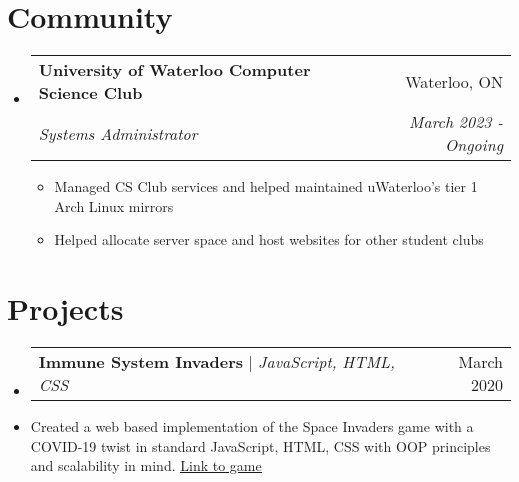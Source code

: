 \documentclass[letterpaper,11pt]{article}
\makeatletter
\newcommand{\resumeItem}[1]{
  \item\small{
    {#1 \vspace{-2pt}}
  }
}
\newcommand{\resumeSubheading}[4]{
  \vspace{-2pt}\item
    \begin{tabular*}{0.97\textwidth}[t]{l@{\extracolsep{\fill}}r}
      \textbf{#1} & #2 \\
      \textit{\small#3} & \textit{\small #4} \\
    \end{tabular*}\vspace{-7pt}
}
\newcommand{\resumeProjectHeading}[2]{
    \item
    \begin{tabular*}{0.97\textwidth}{l@{\extracolsep{\fill}}r}
      \small#1 & #2 \\
    \end{tabular*}\vspace{-7pt}
}
\newcommand{\resumeSubHeadingListStart}{\begin{itemize}[leftmargin=0.15in, label={}]}
\newcommand{\resumeSubHeadingListEnd}{\end{itemize}}
\newcommand{\resumeItemListStart}{\begin{itemize}}
\newcommand{\resumeItemListEnd}{\end{itemize}\vspace{-5pt}}
\makeatother
\begin{document}

\section{Community}
    \resumeSubHeadingListStart

    \resumeSubheading
      {University of Waterloo Computer Science Club}{Waterloo, ON}
      {Systems Administrator} {March 2023 - Ongoing}
      \resumeItemListStart
        \resumeItem{Managed CS Club services and helped maintained uWaterloo's tier 1 Arch Linux mirrors}
        \resumeItem{Helped allocate server space and host websites for other student clubs}
      \resumeItemListEnd
    
    \resumeSubHeadingListEnd



    
\section{Projects}
    \resumeSubHeadingListStart
    \resumeProjectHeading
          {\textbf{Immune System Invaders} $|$ \emph{JavaScript, HTML, CSS}}{March 2020}
          \item
          Created a web based implementation of the Space Invaders game with a COVID-19 twist in standard JavaScript, HTML, CSS with OOP principles and scalability in mind.
      \href{https://jiafengyu.github.io/ISI/game.html}{\underline{Link to game}}
    \resumeSubHeadingListEnd

%
\end{document}
